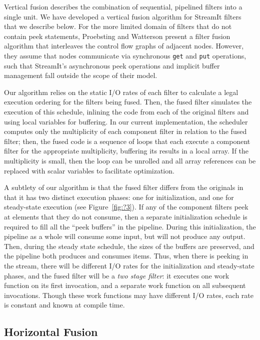 Vertical fusion describes the combination of sequential, pipelined
filters into a single unit.  We have developed a vertical fusion
algorithm for StreamIt filters that we describe below.  For the more
limited domain of filters that do not contain peek statements,
Proebsting and Watterson \cite{pro96} present a filter fusion
algorithm that interleaves the control flow graphs of adjacent nodes.
However, they assume that nodes communicate via synchronous {\tt get}
and {\tt put} operations, such that StreamIt's asynchronous peek
operations and implicit buffer management fall outside the scope of
their model.

Our algorithm relies on the static I/O rates of each filter to
calculate a legal execution ordering for the filters being fused.
Then, the fused filter simulates the execution of this schedule,
inlining the code from each of the original filters and using local
variables for buffering.  In our current implementation, the scheduler
computes only the multiplicity of each component filter in relation to
the fused filter; then, the fused code is a sequence of loops that
each execute a component filter for the appropriate multiplicity,
buffering its results in a local array.  If the multiplicity is small,
then the loop can be unrolled and all array references can be replaced
with scalar variables to facilitate optimization.

A subtlety of our algorithm is that the fused filter differs from the
originals in that it has two distinct execution phases: one for
initialization, and one for steady-state execution (see
Figure~\ref{fig:?3}).  If any of the component filters peek at
elements that they do not consume, then a separate initialization
schedule is required to fill all the ``peek buffers'' in the pipeline.
During this initialization, the pipeline as a whole will consume some
input, but will not produce any output.  Then, during the steady state
schedule, the sizes of the buffers are preserved, and the pipeline
both produces and consumes items.  Thus, when there is peeking in the
stream, there will be different I/O rates for the initialization and
steady-state phases, and the fused filter will be a {\it two stage
filter}: it executes one work function on its first invocation, and a
separate work function on all subsequent invocations.  Though these
work functions may have different I/O rates, each rate is constant and
known at compile time.

\subsection{Horizontal Fusion}

